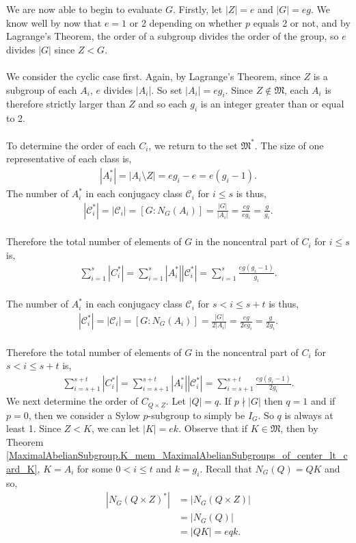 We are now able to begin to evaluate $G$. Firstly, let $|Z| = e$ and $|G| = eg$. We know well by now that $e = 1$ or 2 depending on whether $p$ equals 2 or not, and by Lagrange's Theorem, the order of a subgroup divides the order of the group, so $e$ divides $|G|$ since $Z < G$. \\
\\
We consider the cyclic case first. Again, by Lagrange's Theorem, since $Z$ is a subgroup of each $A_i$, $e$ divides $|A_i|$. So set $|A_i| = eg_i$. Since $Z \notin \mathfrak{M}$, each $A_i$ is therefore strictly larger than $Z$ and so each $g_i$ is an integer greater than or equal to 2. \\
\\
To determine the order of each $C_i$, we return to the set $\mathfrak{M}^*$. The size of one representative of each class is,
\begin{align*} |A_i^*| = |A_i \! \setminus \! Z| = eg_i-e = e(g_i-1). \end{align*}
The number of $A_i^*$ in each conjugacy class $\mathcal{C}_i$ for $i \leq s$ is thus,
\begin{align*} |\mathcal{C}_i^*| = |\mathcal{C}_i| = [G:N_G(A_i)] = \frac{|G|}{|A_i|} = \frac{eg}{eg_i} = \frac{g}{g_i}. \end{align*}
\\
Therefore the total number of elements of $G$ in the noncentral part of $C_i$ for $i \leq s$ is,
\begin{align} \label{classeq1of3} \sum_{i=1}^{s} |C_i^*| = \sum_{i=1}^{s} |A_i^*| |\mathcal{C}_i^*| = \sum_{i=1}^{s} \frac{eg(g_i-1)}{g_i}.
\end{align}
\\
The number of $A_i^*$ in each conjugacy class $\mathcal{C}_i$ for $s < i \leq s+t$ is thus,
\begin{align*} |\mathcal{C}_i^*| = |\mathcal{C}_i| = [G:N_G(A_i)] = \frac{|G|}{2|A_i|} = \frac{eg}{2eg_i} = \frac{g}{2g_i}. \end{align*}
\\
Therefore the total number of elements of $G$ in the noncentral part of $C_i$ for $s < i \leq s+t$ is,
\begin{align}\label{classeq2of3} \sum_{i=s+1}^{s+t} |C_i^*| = \sum_{i=s+1}^{s+t} |A_i^*| |\mathcal{C}_i^*| = \sum_{i=s+1}^{s+t} \frac{eg(g_i-1)}{2g_i}.
\end{align}
We next determine the order of $C_{Q \times Z}$. Let $|Q| = q$. If $p \nmid |G|$ then $q=1$ and if $p = 0$, then we consider a Sylow $p$-subgroup to simply be $I_G$. So $q$ is always at least 1. Since $Z < K$, we can let $|K| = ek$. Observe that if $K \in \mathfrak{M}$, then by Theorem \ref{MaximalAbelianSubgroup.K_mem_MaximalAbelianSubgroups_of_center_lt_card_K}, $K = A_i$ for some $0 < i \leq t$ and $k = g_i$. Recall that $N_G(Q) = QK$ and so,
\begin{align*} |N_G(Q \times Z)^*| &= |N_G(Q \times Z)|  %
\\ &= |N_G(Q)| %
\\ &= |QK| = eqk.
\end{align*}

